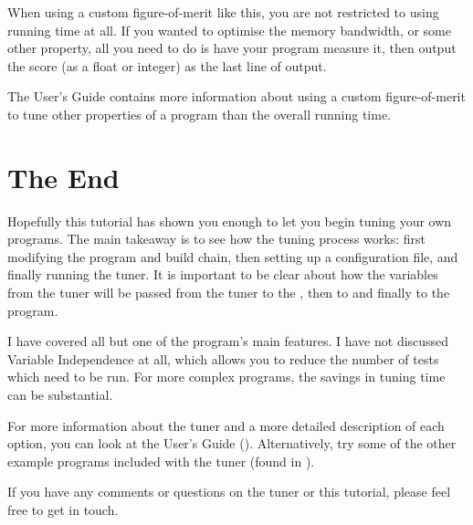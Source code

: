 \documentclass[a4paper]{article}
\begin{document}
When using a custom figure-of-merit like this, you are not 
restricted to using running time at all. If you wanted to optimise the memory 
bandwidth, or some other property, all you need to do is have your program 
measure it, then output the score (as a float or integer) as the last line 
of output.

The User's Guide contains more information about using a custom 
figure-of-merit to tune other properties of a program than the overall 
running time.




\section{The End}
Hopefully this tutorial has shown you enough to let you begin tuning your own 
programs. The main takeaway is to see how the tuning process works: first 
modifying the program and build chain, then setting up a configuration file, 
and finally running the tuner. It is important to be clear about how the 
variables from the tuner will be passed from the tuner to the 
, then to  and finally to the program.

I have covered all but one of the program's main features. I have not 
discussed Variable Independence at all, which allows you to reduce the 
number of tests which need to be run. For more complex programs, 
the savings in tuning time can be substantial.

For more information about the tuner and a more detailed description of each 
option, you can look at the User's Guide (). 
Alternatively, try some of the other example programs included with the tuner 
(found in ).

If you have any comments or questions on the tuner or this tutorial, please 
feel free to get in touch.
\end{document}
